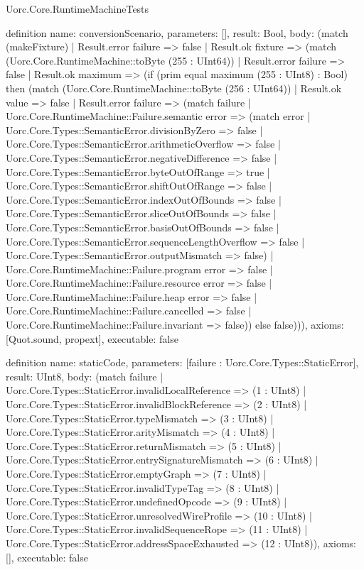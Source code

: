 \begin{lexlean}{Uorc.Core.RuntimeMachineTests}
\begin{semanticmodule}
definition{
  name: conversionScenario,
  parameters: [],
  result: Bool,
  body: (match (makeFixture)
    | Result.error failure => false
    | Result.ok fixture => (match (Uorc.Core.RuntimeMachine::toByte (255 : UInt64))
      | Result.error failure => false
      | Result.ok maximum => (if (prim equal maximum (255 : UInt8) : Bool) then (match (Uorc.Core.RuntimeMachine::toByte (256 : UInt64))
        | Result.ok value => false
        | Result.error failure => (match failure
          | Uorc.Core.RuntimeMachine::Failure.semantic error => (match error
            | Uorc.Core.Types::SemanticError.divisionByZero => false
            | Uorc.Core.Types::SemanticError.arithmeticOverflow => false
            | Uorc.Core.Types::SemanticError.negativeDifference => false
            | Uorc.Core.Types::SemanticError.byteOutOfRange => true
            | Uorc.Core.Types::SemanticError.shiftOutOfRange => false
            | Uorc.Core.Types::SemanticError.indexOutOfBounds => false
            | Uorc.Core.Types::SemanticError.sliceOutOfBounds => false
            | Uorc.Core.Types::SemanticError.basisOutOfBounds => false
            | Uorc.Core.Types::SemanticError.sequenceLengthOverflow => false
            | Uorc.Core.Types::SemanticError.outputMismatch => false)
          | Uorc.Core.RuntimeMachine::Failure.program error => false
          | Uorc.Core.RuntimeMachine::Failure.resource error => false
          | Uorc.Core.RuntimeMachine::Failure.heap error => false
          | Uorc.Core.RuntimeMachine::Failure.cancelled => false
          | Uorc.Core.RuntimeMachine::Failure.invariant => false)) else false))),
  axioms: [Quot.sound, propext],
  executable: false
}

definition{
  name: staticCode,
  parameters: [failure : Uorc.Core.Types::StaticError],
  result: UInt8,
  body: (match failure
    | Uorc.Core.Types::StaticError.invalidLocalReference => (1 : UInt8)
    | Uorc.Core.Types::StaticError.invalidBlockReference => (2 : UInt8)
    | Uorc.Core.Types::StaticError.typeMismatch => (3 : UInt8)
    | Uorc.Core.Types::StaticError.arityMismatch => (4 : UInt8)
    | Uorc.Core.Types::StaticError.returnMismatch => (5 : UInt8)
    | Uorc.Core.Types::StaticError.entrySignatureMismatch => (6 : UInt8)
    | Uorc.Core.Types::StaticError.emptyGraph => (7 : UInt8)
    | Uorc.Core.Types::StaticError.invalidTypeTag => (8 : UInt8)
    | Uorc.Core.Types::StaticError.undefinedOpcode => (9 : UInt8)
    | Uorc.Core.Types::StaticError.unresolvedWireProfile => (10 : UInt8)
    | Uorc.Core.Types::StaticError.invalidSequenceRope => (11 : UInt8)
    | Uorc.Core.Types::StaticError.addressSpaceExhausted => (12 : UInt8)),
  axioms: [],
  executable: false
}


\end{semanticmodule}
\end{lexlean}

